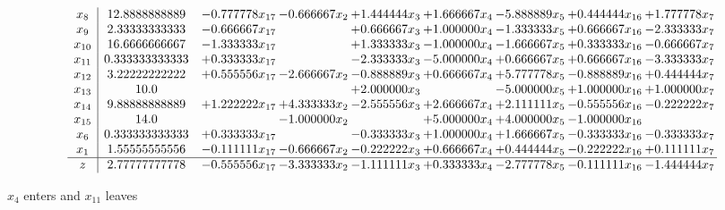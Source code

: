 \documentclass[10pt]{article}
\begin{document}
 \[\begin{array}{c| c c@{\hskip 2pt} c@{\hskip 2pt} c@{\hskip 2pt} c@{\hskip 2pt} c@{\hskip 2pt} c@{\hskip 2pt} c@{\hskip 2pt} }
 x_{8}   &  12.8888888889 & -0.777778 x_{17} & -0.666667 x_{2} & + 1.444444 x_{3} & + 1.666667 x_{4} & -5.888889 x_{5} & + 0.444444 x_{16} & + 1.777778 x_{7}\\
 x_{9}   &  2.33333333333 & -0.666667 x_{17} &   & + 0.666667 x_{3} & + 1.000000 x_{4} & -1.333333 x_{5} & + 0.666667 x_{16} & -2.333333 x_{7}\\
 x_{10}   &  16.6666666667 & -1.333333 x_{17} &   & + 1.333333 x_{3} & -1.000000 x_{4} & -1.666667 x_{5} & + 0.333333 x_{16} & -0.666667 x_{7}\\
 x_{11}   &  0.333333333333 & + 0.333333 x_{17} &   & -2.333333 x_{3} & -5.000000 x_{4} & + 0.666667 x_{5} & + 0.666667 x_{16} & -3.333333 x_{7}\\
 x_{12}   &  3.22222222222 & + 0.555556 x_{17} & -2.666667 x_{2} & -0.888889 x_{3} & + 0.666667 x_{4} & + 5.777778 x_{5} & -0.888889 x_{16} & + 0.444444 x_{7}\\
 x_{13}   &  10.0  &    &   & + 2.000000 x_{3} &   & -5.000000 x_{5} & + 1.000000 x_{16} & + 1.000000 x_{7}\\
 x_{14}   &  9.88888888889 & + 1.222222 x_{17} & + 4.333333 x_{2} & -2.555556 x_{3} & + 2.666667 x_{4} & + 2.111111 x_{5} & -0.555556 x_{16} & -0.222222 x_{7}\\
 x_{15}   &  14.0  &   & -1.000000 x_{2} &   & + 5.000000 x_{4} & + 4.000000 x_{5} & -1.000000 x_{16} &   \\
 x_{6}   &  0.333333333333 & + 0.333333 x_{17} &   & -0.333333 x_{3} & + 1.000000 x_{4} & + 1.666667 x_{5} & -0.333333 x_{16} & -0.333333 x_{7}\\
 x_{1}   &  1.55555555556 & -0.111111 x_{17} & -0.666667 x_{2} & -0.222222 x_{3} & + 0.666667 x_{4} & + 0.444444 x_{5} & -0.222222 x_{16} & + 0.111111 x_{7}\\
\hline
z    &  2.77777777778 & -0.555556 x_{17} & -3.333333 x_{2} & -1.111111 x_{3} & + 0.333333 x_{4} & -2.777778 x_{5} & -0.111111 x_{16} & -1.444444 x_{7}\\
\end{array}\]


 $ x_{4} $ enters and $ x_{11} $ leaves 
\end{document}
